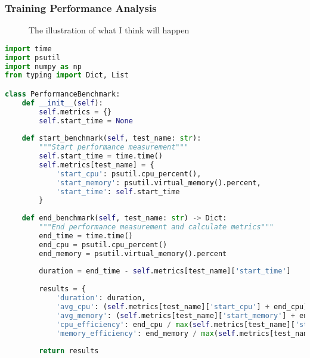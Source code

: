 \subsubsection{Training Performance Analysis}
\begin{figure}[htbp]
\centering
{}
\caption{The illustration of what I think will happen}
\label{fig:accuracy-convergence}
\end{figure}
\begin{lstlisting}[language=python, caption=Performance Benchmarking Code]
import time
import psutil
import numpy as np
from typing import Dict, List

class PerformanceBenchmark:
    def __init__(self):
        self.metrics = {}
        self.start_time = None
        
    def start_benchmark(self, test_name: str):
        """Start performance measurement"""
        self.start_time = time.time()
        self.metrics[test_name] = {
            'start_cpu': psutil.cpu_percent(),
            'start_memory': psutil.virtual_memory().percent,
            'start_time': self.start_time
        }
        
    def end_benchmark(self, test_name: str) -> Dict:
        """End performance measurement and calculate metrics"""
        end_time = time.time()
        end_cpu = psutil.cpu_percent()
        end_memory = psutil.virtual_memory().percent
        
        duration = end_time - self.metrics[test_name]['start_time']
        
        results = {
            'duration': duration,
            'avg_cpu': (self.metrics[test_name]['start_cpu'] + end_cpu) / 2,
            'avg_memory': (self.metrics[test_name]['start_memory'] + end_memory) / 2,
            'cpu_efficiency': end_cpu / max(self.metrics[test_name]['start_cpu'], 1),
            'memory_efficiency': end_memory / max(self.metrics[test_name]['start_memory'], 1)        }
        
        return results
\end{lstlisting}

